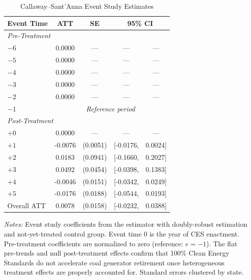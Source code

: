 \begin{table}[t]
\centering
\caption{Callaway--Sant'Anna Event Study Estimates}
\label{tab:event_study}
\begin{tabular}{lcccc}
\toprule
Event Time & ATT & SE & \multicolumn{2}{c}{95\% CI} \\
\midrule
\multicolumn{5}{l}{\textit{Pre-Treatment}} \\[3pt]
$-6$ & 0.0000 & --- & --- & --- \\
$-5$ & 0.0000 & --- & --- & --- \\
$-4$ & 0.0000 & --- & --- & --- \\
$-3$ & 0.0000 & --- & --- & --- \\
$-2$ & 0.0000 & --- & --- & --- \\
$-1$ & \multicolumn{4}{c}{\textit{Reference period}} \\
[6pt]
\multicolumn{5}{l}{\textit{Post-Treatment}} \\[3pt]
$+0$ & 0.0000 & --- & --- & --- \\
$+1$ & -0.0076 & (0.0051) & [-0.0176, & 0.0024] \\
$+2$ & 0.0183 & (0.0941) & [-0.1660, & 0.2027] \\
$+3$ & 0.0492 & (0.0454) & [-0.0398, & 0.1383] \\
$+4$ & -0.0046 & (0.0151) & [-0.0342, & 0.0249] \\
$+5$ & -0.0176 & (0.0188) & [-0.0544, & 0.0193] \\
[6pt]
\midrule
Overall ATT & 0.0078 & (0.0158) & [-0.0232, & 0.0388] \\
\bottomrule
\end{tabular}
\begin{minipage}{0.92\textwidth}
\vspace{4pt}
\footnotesize
\textit{Notes:} Event study coefficients from the \citet{CallawayS2021} estimator
with doubly-robust estimation and not-yet-treated control group. Event time 0 is the year
of CES enactment. Pre-treatment coefficients are normalized to zero (reference: $e = -1$).
The flat pre-trends and null post-treatment effects confirm that 100\% Clean Energy Standards
do not accelerate coal generator retirement once heterogeneous treatment effects are properly
accounted for. Standard errors clustered by state.
\end{minipage}
\end{table}

